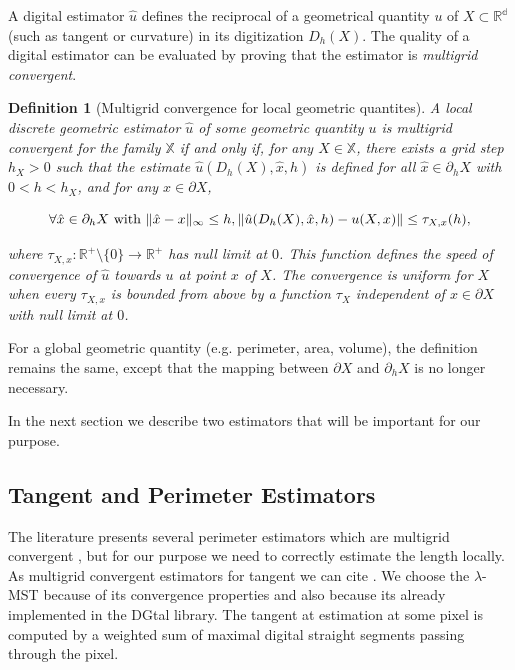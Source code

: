 \documentclass[runningheads]{llncs}
\newtheorem{ddef}{Definition}
\DeclarePairedDelimiter\norm{\lVert}{\rVert}%
\begin{document}
A digital estimator $\hat{u}$ defines  the reciprocal of a geometrical quantity $u$ of $X \subset \mathbb{R^d}$ (such as tangent or curvature) in its digitization $D_h(X)$. The quality of a digital estimator can be evaluated by proving that the estimator is \textit{multigrid convergent}. 
	
	\begin{ddef}[Multigrid convergence for local geometric quantites]
		A local discrete geometric estimator $\hat{u}$ of some geometric quantity $u$ is multigrid convergent for the family $\mathbb{X}$ if and only if, for any $X \in \mathbb{X}$, there exists a grid step $h_X>0$ such that the estimate $\hat{u}(D_h(X),\hat{x},h)$ is defined for all $\hat{x} \in \partial_hX$ with $ 0 < h < h_X$, and for any $x \in \partial X$,
		
		\begin{equation}
			\forall \hat{x} \in  \partial_hX \text{ with } \norm{ \hat{x} - x }_{\infty} \leq h, \norm{ \hat{u}(D_h(X),\hat{x},h) - u(X,x)} \leq \tau_{X,x}(h),			
		\end{equation}
		
		where $\tau_{X,x}:\mathbb{R}^{+}\setminus\{0\} \rightarrow \mathbb{R}^{+}$ has null limit at $0$. This function defines the speed of convergence of $\hat{u}$ towards $u$ at point $x$ of $X$. The convergence is uniform for $X$ when every $\tau_{X,x}$ is bounded from above by a function $\tau_X$ independent of $x \in \partial X$ with null limit at $0$.
	\end{ddef}
	
	
	For a global geometric quantity (e.g. perimeter, area, volume), the definition remains the same, except that the mapping between $\partial X$ and $\partial_h X$ is no longer necessary.
	
In the next section we describe two estimators that will be important for our purpose.

\subsection{Tangent and Perimeter Estimators}

The literature presents several perimeter estimators which are multigrid convergent \cite{}, but for our purpose we need to correctly estimate the length locally. As multigrid convergent estimators for tangent we can cite \cite{}. We choose the $\lambda$-MST because of its convergence properties and also because its already implemented in the DGtal library. The tangent at estimation at some pixel is computed by a weighted sum of maximal digital straight segments passing through the pixel.
\end{document}

